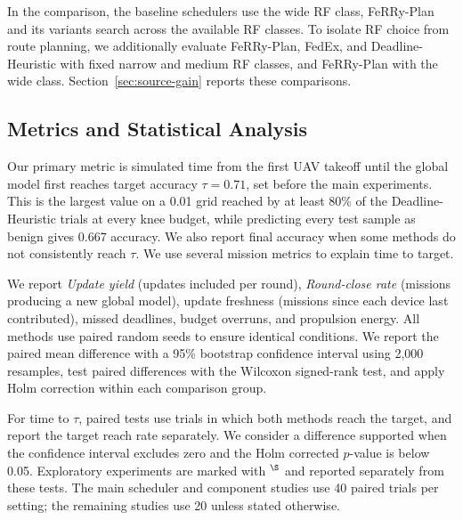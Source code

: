\documentclass[conference]{IEEEtran}
\newcommand{\sysname}{FeRRy}
\begin{document}
In the comparison, the baseline schedulers use the wide RF class, \sysname{}-Plan and its variants search across the available RF
classes. To isolate RF choice from route planning, we additionally evaluate
\sysname{}-Plan, FedEx, and Deadline-Heuristic with fixed narrow and medium RF
classes, and \sysname{}-Plan with the wide class. Section~\ref{sec:source-gain}
reports these comparisons.

\subsection{Metrics and Statistical Analysis}
\label{sec:metrics}

Our primary metric is simulated time from the first UAV takeoff until the global model first reaches target accuracy \(\tau=0.71\), set before the main
experiments. This is the largest value on a 0.01 grid reached by at least 80\%
of the Deadline-Heuristic trials at every knee budget, while predicting every test sample as
benign gives 0.667 accuracy. We also
report final accuracy when some methods do not consistently reach
\(\tau\). We use several mission metrics to explain time to target.

We report \emph{Update yield}
(updates included per round), \emph{Round-close rate}
(missions producing a new global model), update freshness (missions since each device last contributed), missed deadlines, budget overruns, and propulsion energy. All methods  use paired random seeds to ensure identical conditions. We report the
paired mean difference with a 95\% bootstrap confidence interval
using 2,000 resamples, test paired differences with the Wilcoxon signed-rank test, and apply
Holm correction within each comparison group.

For time to \(\tau\), paired tests use trials in which both methods reach
the target, and report the target reach rate separately. We consider a
difference supported when the confidence interval excludes zero
and the Holm corrected \(p\)-value is below 0.05. Exploratory
experiments are marked with \(^{\S}\) and reported separately from these tests.
The main scheduler and component studies use 40 paired trials per setting; the
remaining studies use 20 unless stated otherwise.



\end{document}
